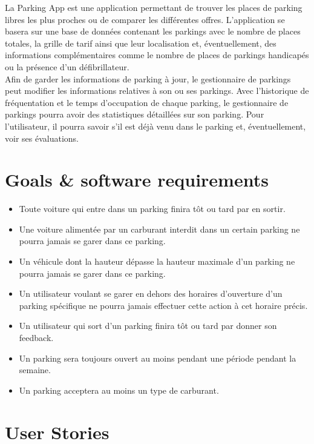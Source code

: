 \documentclass[a4paper,11pt]{article}
\begin{document}
La Parking App est une application permettant de trouver les places de parking libres les plus proches ou de comparer les différentes offres.  L'application se basera sur une base de données contenant les parkings avec le nombre de places totales, la grille de tarif ainsi que leur localisation et, éventuellement, des informations complémentaires comme le nombre de places de parkings handicapés ou la présence d'un défibrillateur.\\

Afin de garder les informations de parking à jour, le gestionnaire de parkings peut modifier les informations relatives à son ou ses parkings.  Avec l'historique de fréquentation et le temps d'occupation de chaque parking, le gestionnaire de parkings pourra avoir des statistiques détaillées sur son parking.  Pour l'utilisateur, il pourra savoir s'il est déjà venu dans le parking et, éventuellement, voir ses évaluations.



\section{Goals \& software requirements}\label{goals}

\begin{itemize}
  \item Toute voiture qui entre dans un parking finira tôt ou tard par en sortir.
  \item Une voiture alimentée par un carburant interdit dans un certain parking ne pourra jamais se garer dans ce parking.
  \item Un véhicule dont la hauteur dépasse la hauteur maximale d'un parking ne pourra jamais se garer dans ce parking.
  \item Un utilisateur voulant se garer en dehors des horaires d'ouverture d'un parking spécifique ne pourra jamais effectuer cette action à cet horaire précis.
  \item Un utilisateur qui sort d'un parking finira tôt ou tard par donner son feedback.
  \item Un parking sera toujours ouvert au moins pendant une période pendant la semaine.
  \item Un parking acceptera au moins un type de carburant.
\end{itemize}

\section{User Stories}\label{users-stories}
\end{document}
